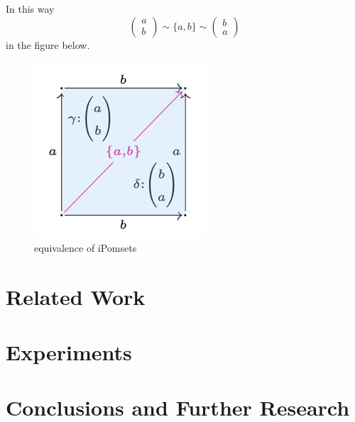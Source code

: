 \documentclass[12pt]{article}
\begin{document}
In this way \[
\begin{pmatrix} a \\ b \end{pmatrix}
\sim 
\{a,b\}
\sim
\begin{pmatrix} b \\ a \end{pmatrix}
\]
 in the figure below.
\begin{figure}[h]
    \centering
    \includegraphics[width=0.3\linewidth]{image.png}
    \caption{equivalence of iPomsets}
    \label{fig:ipomset-equivalence}
\end{figure}
\section{Related Work}\label{relatedwork}

\section{Experiments}\label{experiments}

\section{Conclusions and Further Research}\label{conclusions}





\end{document}
